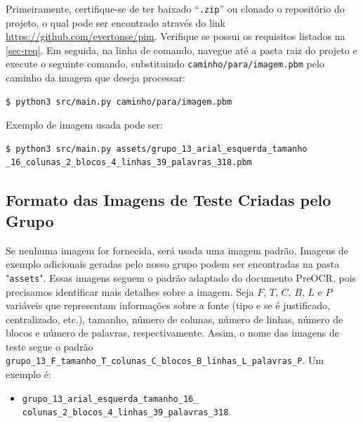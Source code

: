 \documentclass[english, 
               brazil, 
               bsc] %
               {dcomp-abntex2}
\begin{document}
Primeiramente, certifique-se de ter baixado ``\texttt{.zip}'' ou clonado o repositório do projeto, o qual pode ser encontrado através do link \url{https://github.com/evertonse/pim}. Verifique se possui os requisitos listados na \autoref{sec-req}. Em seguida, na linha de comando, navegue até a pasta raiz do projeto e execute o seguinte comando, substituindo \texttt{caminho/para/imagem.pbm} pelo caminho da imagem que deseja processar:


\begin{verbatim}
$ python3 src/main.py caminho/para/imagem.pbm
\end{verbatim}


Exemplo de imagem usada pode ser:
\begin{verbatim}
$ python3 src/main.py assets/grupo_13_arial_esquerda_tamanho
_16_colunas_2_blocos_4_linhas_39_palavras_318.pbm
\end{verbatim}


\subsection{Formato das Imagens de Teste Criadas pelo Grupo}
Se nenhuma imagem for fornecida, será usada uma imagem padrão. Imagens de exemplo adicionais geradas pelo nosso grupo podem ser encontradas na pasta "\texttt{assets}". Essas imagens seguem o padrão adaptado do documento PreOCR, pois precisamos identificar mais detalhes sobre a imagem. Seja $F$, $T$, $C$, $B$, $L$ e $P$ variáveis que representam informações sobre a fonte (tipo e se é justificado, centralizado, etc.), tamanho, número de colunas, número de linhas, número de blocos e número de palavras, respectivamente. Assim, o nome das imagens de teste segue o padrão \texttt{grupo\_13\_F\_tamanho\_T\_colunas\_C\_blocos\_B\_linhas\_L\_palavras\_P}. Um exemplo é:


\begin{itemize}
  \item \texttt{\small grupo\_13\_arial\_esquerda\_tamanho\_16\_
    colunas\_2\_blocos\_4\_linhas\_39\_palavras\_318}.
\end{itemize}
\end{document}
